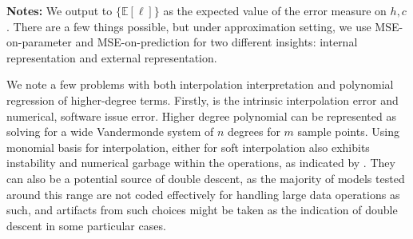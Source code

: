 \documentclass[10pt]{article} %
\begin{document}
\begin{table}[htb]
\begin{threeparttable}
    \begin{tablenotes}
      \footnotesize
      \item[] \textbf{Notes:} We output to $\{\mathbb{E}[\ell]\}$ as the expected value of the error measure on $h,c$. There are a few things possible, but under approximation setting, we use MSE-on-parameter and MSE-on-prediction for two different insights: internal representation and external representation. 
    \end{tablenotes}
  \end{threeparttable}
\end{table}

We note a few problems with both interpolation interpretation and polynomial regression of higher-degree terms. Firstly, is the intrinsic interpolation error and numerical, software issue error. Higher degree polynomial can be represented as solving for a wide Vandermonde system of $n$ degrees for $m$ sample points. Using monomial basis for interpolation, either for soft interpolation also exhibits instability and numerical garbage within the operations, as indicated by \cite{Shen_2025}. They can also be a potential source of double descent, as the majority of models tested around this range are not coded effectively for handling large data operations as such, and artifacts from such choices might be taken as the indication of double descent in some particular cases. 
\end{document}
